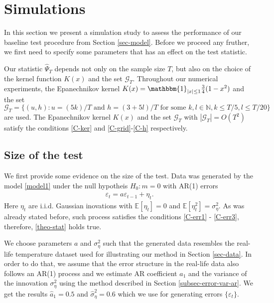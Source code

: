 
\section{Simulations}\label{sec-sim}
In this section we present a simulation study to assess the performance of our baseline test procedure from Section \ref{sec-model}. Before we proceed any fruther, we first need to specify some parameters that has an effect on the test statistic.

Our statistic $\widehat{\Psi}_T$ depends not only on the sample size $T$, but also on the choice of the kernel function $K(x)$ and the set $\mathcal{G}_T$. Throughout our numerical experiments, the Epanechnikov kernel $K(x) = \mathbbm{1}_{|x|\leq 1} \frac{3}{4} (1 - x^2)$ and the set $\mathcal{G}_T = \{(u, h): u = (5k)/T \text{ and } h = (3+5l)/T \text{ for some } k, l \in \mathbb{N}, k \le T/5, l \le T/20\}$ are used. The Epanechnikov kernel $K(x)$ and the set $\mathcal{G}_T$ with $|\mathcal{G}_T| = O(T^2)$ satisfy the conditions \ref{C-ker} and \ref{C-grid}-\ref{C-h} respectively.


\subsection{Size of the test}\label{subsec-sim-size}
We first provide some evidence on the size of the test. Data was generated by the model \ref{model1} under the null hypotheis $H_0: m=0$ with AR(1) errors
\begin{align*}
\varepsilon_t = a \varepsilon_{t-1} + \eta_t.
\end{align*}
Here $\eta_t$ are i.i.d. Gaussian inovations with $\mathbb{E}[\eta_t] = 0$ and $\mathbb{E}[\eta_t^2] = \sigma_{\eta}^2$. As was already stated before, such process satisfies the conditions \ref{C-err1} - \ref{C-err3}, therefore, \ref{theo-stat} holds true.

We choose parameters $a$ and $ \sigma_{\eta}^2$ such that the generated data resembles the real-life temperature dataset used for illustrating our method in Section \ref{sec-data}. In order to do that, we assume that the error structure in the real-life data also follows an AR(1) process and we estimate AR coefficient $a_1$ and the variance of the innovation $\sigma_{\eta}^2$ using the method described in Section \ref{subsec-error-var-ar}. We get the results $\hat{a}_1 = 0.5$ and $\hat{\sigma}_{\eta}^2 = 0.6$ which we use for generating errors $\{\varepsilon_t\}$.

